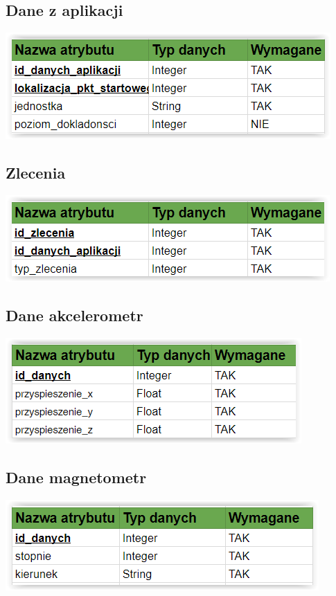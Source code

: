 \documentclass[11pt]{article}
\begin{document}
	\subsection{Dane z aplikacji}
	\begin{center}
		\includegraphics[scale=1]{daneAplikacji.PNG}
	\end{center}
	\subsection{Zlecenia}
	\begin{center}
		\includegraphics[scale=1]{zlecenia.PNG}
	\end{center}
	\subsection{Dane akcelerometr}
	\begin{center}
		\includegraphics[scale=1]{daneAkcelerometr.PNG}
	\end{center}
	\subsection{Dane magnetometr}
	\begin{center}
		\includegraphics[scale=1]{daneMagnetometr.PNG}
	\end{center}
\end{document}

